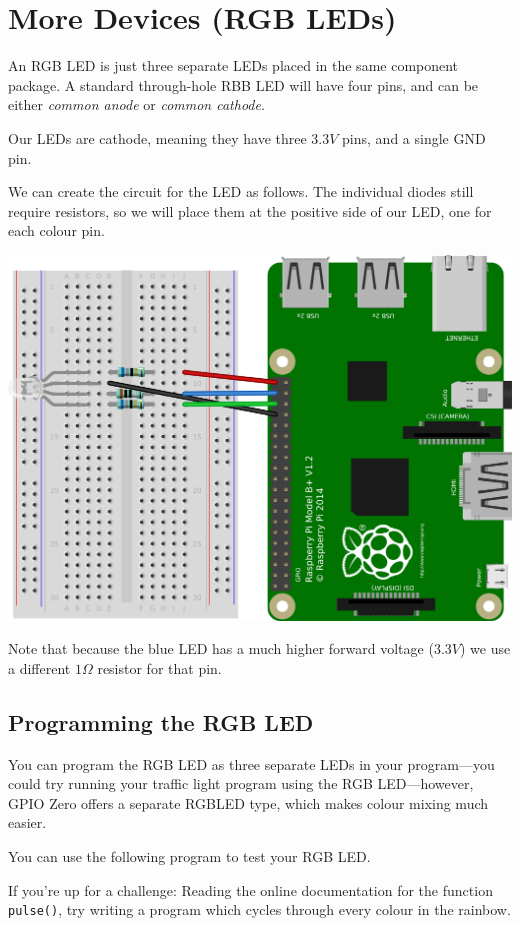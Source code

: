 \section{More Devices (RGB LEDs)}

	An RGB LED is just three separate LEDs placed in the same component package. A standard through-hole RBB LED will have four pins, and can be either \textit{common anode} or \textit{common cathode}.
	
	Our LEDs are cathode, meaning they have three $3.3 V$ pins, and a single GND pin.
	
	We can create the circuit for the LED as follows. The individual diodes still require resistors, so we will place them at the positive side of our LED, one for each colour pin.
	
	\begin{center}
		\includegraphics[width=0.7\linewidth]{McrRaspJam/015_GPIOZero/3_rgb/2}
	\end{center}
	
	Note that because the blue LED has a much higher forward voltage ($3.3 V$) we use a different $1 \Omega$ resistor for that pin.
	
	\subsection*{Programming the RGB LED}
	
		You can program the RGB LED as three separate LEDs in your program---you could try running your traffic light program using the RGB LED---however, GPIO Zero offers a separate RGBLED type, which makes colour mixing much easier.
		
		You can use the following program to test your RGB LED.
		
		
		
		If you're up for a challenge: Reading the online documentation for the function \texttt{pulse()}, try writing a program which cycles through every colour in the rainbow.